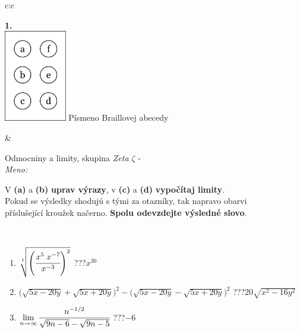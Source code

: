 \documentclass[10pt]{report}
\begin{document}
\begin{tabular}{c:c}
\begin{minipage}[c][104.5mm][t]{0.5\linewidth}
\begin{center}
\begin{minipage}{0.20\linewidth}
\begin{center}
{\Huge\bfseries 1.} \\[2mm]
\includegraphics[height=40mm]{../images/braille.png}
{\small Písmeno Braillovej abecedy}
\end{center}
\end{minipage}
\end{center}
\end{minipage}
&
\begin{minipage}[c][104.5mm][t]{0.5\linewidth}
\begin{center}
\vspace{7mm}
{\huge Odmocniny a limity, skupina \textit{Zeta $\zeta$} -}\\[5mm]
\textit{Meno:}\phantom{xxxxxxxxxxxxxxxxxxxxxxxxxxxxxxxxxxxxxxxxxxxxxxxxxxxxxxxxxxxxxxxxx}\\[5mm]
\begin{minipage}{0.95\linewidth}
\begin{center}
V \textbf{(a)} a \textbf{(b)} \textbf{uprav výrazy}, v \textbf{(c)} a \textbf{(d)} \textbf{vypočítaj limity}.\\Pokud se výsledky shodujú s tými za otazníky, tak napravo obarvi\\příslušející kroužek načerno. \textbf{Spolu odevzdejte výsledné slovo}.
\end{center}
\end{minipage}
\\[1mm]
\begin{minipage}{0.79\linewidth}
\begin{center}
\begin{varwidth}{\linewidth}
\begin{enumerate}
\small
\item $\sqrt[1]{\left(\cfrac{x^{5}\;x^{-7}}{x^{-3}}\right)^{2}}$\quad \dotfill\; ???\;\dotfill \quad $x^{30}$
\item {\footnotesize{\scriptsize$\big(\sqrt{5x-20y}+\sqrt{5x+20y}\big)^2-\big(\sqrt{5x-20y}-\sqrt{5x+20y}\big)^2$}\quad \dotfill\; ???\;\dotfill \quad $20\sqrt{x^2-16y^2}$}
\item $\lim\limits_{n\to\infty}\cfrac{n^{-1/2}}{\sqrt{9n-6}-\sqrt{9n-5}}$\quad \dotfill\; ???\;\dotfill \quad $-6$

\end{enumerate}
\end{varwidth}
\end{center}
\end{minipage}
\end{center}
\end{minipage}
\end{tabular}
\end{document}
